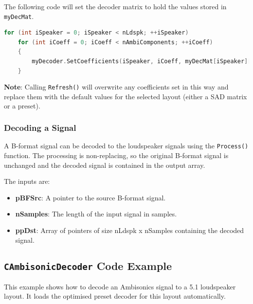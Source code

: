 \documentclass[12pt]{report}
\newcommand{\code}[1]{\texttt{#1}}
\begin{document}
The following code will set the decoder matrix to hold the values stored in \code{myDecMat}.

\begin{lstlisting}[language=C++]
for (int iSpeaker = 0; iSpeaker < nLdspk; ++iSpeaker)
    for (int iCoeff = 0; iCoeff < nAmbiComponents; ++iCoeff)
    {
        myDecoder.SetCoefficients(iSpeaker, iCoeff, myDecMat[iSpeaker][iCoeff]);
    }
\end{lstlisting}

\textbf{Note}: Calling \code{Refresh()} will overwrite any coefficients set in this way and replace them with the default values for the selected layout (either a SAD matrix or a preset).

\subsubsection{Decoding a Signal}

A B-format signal can be decoded to the loudspeaker signals using the \code{Process()} function. The processing is non-replacing, so the original B-format signal is unchanged and the decoded signal is contained in the output array.

The inputs are:
\begin{itemize}
    \item \textbf{pBFSrc}: A pointer to the source B-format signal.
    \item \textbf{nSamples}: The length of the input signal in samples.
    \item \textbf{ppDst}: Array of pointers of size nLdspk x nSamples containing the decoded signal.
\end{itemize}

\subsection{\code{CAmbisonicDecoder} Code Example}

This example shows how to decode an Ambisonics signal to a 5.1 loudspeaker layout. It loads the optimised preset decoder for this layout automatically.
\end{document}
